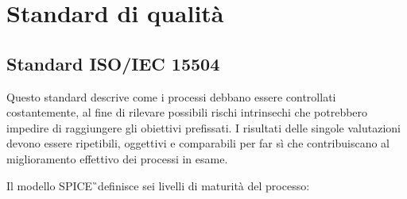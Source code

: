 \section{Standard di qualità}

\subsection{Standard ISO/IEC 15504}
\label{cap: sezione 4.1 Standard ISO/IEC 15504}

Questo standard descrive come i processi debbano essere controllati costantemente, al fine di rilevare possibili rischi intrinsechi che potrebbero impedire di raggiungere gli obiettivi prefissati. I risultati delle singole valutazioni devono essere ripetibili, oggettivi e comparabili per far sì che contribuiscano al miglioramento effettivo dei processi in esame. \newline

Il modello SPICE\G\ definisce sei livelli di maturità del processo:

